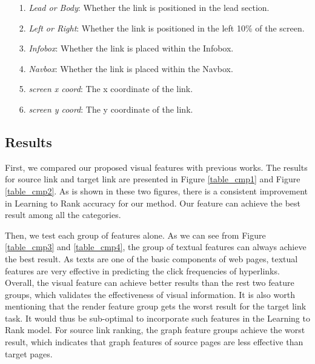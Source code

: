 \begin{itemize}
    \item[1.] \emph{Lead or Body}: Whether the link is positioned in the lead section.

    \item[2.] \emph{Left or Right}: Whether the link is positioned in the left 10\% of the screen.

    \item[3.] \emph{Infobox}: Whether the link is placed within the Infobox.

    \item[4.] \emph{Navbox}: Whether the link is placed within the Navbox.

    \item[5.] \emph{screen x coord}: The x coordinate of the link.
    
    \item[6.] \emph{screen y coord}: The y coordinate of the link.
    
\end{itemize}

\subsection{Results}

First, we compared our proposed visual features with previous works. The results for source link and target link are presented in Figure \ref{table_cmp1} and Figure \ref{table_cmp2}. As is shown in these two figures, there is a consistent improvement in Learning to Rank accuracy for our method. Our feature can achieve the best result among all the categories.

Then, we test each group of features alone. As we can see from Figure \ref{table_cmp3} and \ref{table_cmp4}, the group of textual features can always achieve the best result. As texts are one of the basic components of web pages, textual features are very effective in predicting the click frequencies of hyperlinks. Overall, the visual feature can achieve better results than the rest two feature groups, which validates the effectiveness of visual information. It is also worth mentioning that the render feature group gets the worst result for the target link task. It would thus be sub-optimal to incorporate such features in the Learning to Rank model. For source link ranking, the graph feature groups achieve the worst result, which indicates that graph features of source pages are less effective than target pages.


